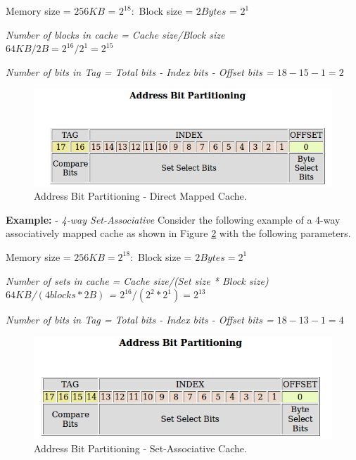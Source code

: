 Memory size = $256 KB$ = $2^{18}:$ 
Block size = $2 Bytes$ = $2^1$ 

\textit{Number of blocks in cache = Cache size/Block size 
\\
\hspace*{5em}
$64KB/2B = 2^{16}/2^1 = 2^{15}$}

\textit{Number of bits in Tag = Total bits - Index bits - Offset bits = $18-15-1 = 2$}
\\

\begin{figure}[tb]

   \includegraphics[scale=0.7]{figures/img/direct-abp.png}
   \caption{Address Bit Partitioning - Direct Mapped Cache.}
\label{abp-direct}
\end{figure}




\textbf{Example:} - \textit{4-way Set-Associative}
Consider the following example of a 4-way associatively mapped cache as shown in Figure \ref{set-abp} with the following parameters.

Memory size = $256KB = 2^{18}: $
Block size = $2 Bytes = 2^1$

\textit{Number of sets in cache = Cache size/(Set size * Block size) \\
\hspace*{5em}
 $64KB$/$(4  blocks * 2B)$ =
$2^{16}/(2^2 * 2^1) = 2^{13}$}

\textit{Number of bits in Tag = Total bits - Index bits - Offset bits = $18-13-1 = 4$}


\begin{figure}[tb!]

   \includegraphics[scale=0.7]{figures/img/set-abp.png}
   \caption{Address Bit Partitioning - Set-Associative Cache.}
\label{set-abp}
\end{figure}


